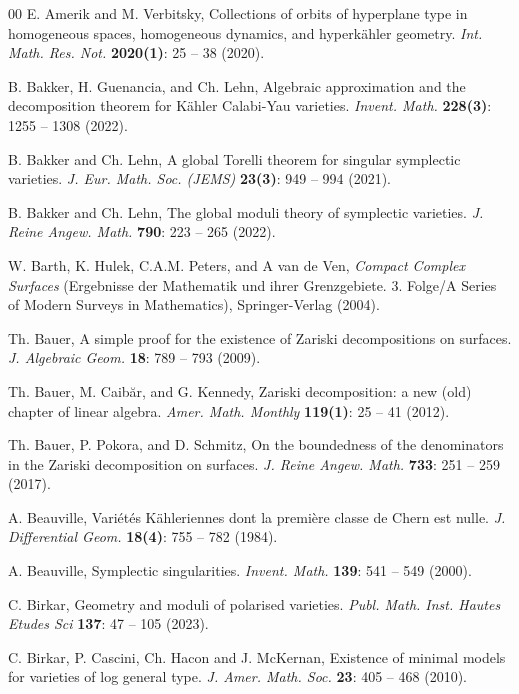 \documentclass[12pt,reqno]{amsart}
\theoremstyle{plain}
\theoremstyle{definition}
\begin{document}
\begin{thebibliography}{00}
E. Amerik and M. Verbitsky, Collections of orbits of hyperplane type in homogeneous spaces, homogeneous dynamics, and hyperk\"ahler geometry. \textit{Int. Math. Res. Not.} \textbf{2020(1)}:  25 -- 38 (2020).


B. Bakker, H. Guenancia, and Ch. Lehn, Algebraic approximation and the decomposition theorem for K\"ahler Calabi-Yau varieties. \textit{Invent. Math.} \textbf{228(3)}: 1255 -- 1308 (2022).


B. Bakker and Ch. Lehn, A global Torelli theorem for singular symplectic varieties. \textit{J. Eur. Math. Soc. (JEMS)} \textbf{23(3)}: 949 -- 994 (2021).

B. Bakker and Ch. Lehn, The global moduli theory of symplectic varieties. \textit{J. Reine Angew. Math.} \textbf{790}: 223 -- 265 (2022).

W. Barth, K. Hulek, C.A.M. Peters, and A van de Ven, \textit{Compact Complex Surfaces} (Ergebnisse der Mathematik und ihrer Grenzgebiete. 3. Folge/A Series of Modern Surveys in Mathematics), Springer-Verlag (2004).

 Th. Bauer, A simple proof for the existence of Zariski decompositions on surfaces. 
\textit{J. Algebraic Geom.} \textbf{18}: 789 -- 793 (2009).

 Th. Bauer, M. Caib\u ar, and G. Kennedy,  Zariski decomposition: a new (old) chapter of linear algebra. \textit{Amer. Math. Monthly} \textbf{119(1)}:  25 -- 41 (2012).

Th. Bauer, P. Pokora, and D. Schmitz, On the boundedness of the denominators in the Zariski decomposition on surfaces. \textit{J. Reine Angew. Math.} \textbf{733}: 251 -- 259 (2017).

A. Beauville, Vari\'et\'es K\"ahleriennes dont la premi\`ere classe de Chern est nulle.
\textit{J. Differential Geom.} \textbf{18(4)}: 755 -- 782 (1984).

 A. Beauville, Symplectic singularities. \textit{Invent. Math.} \textbf{139}: 541 -- 549 (2000). 

C. Birkar, Geometry and moduli of polarised varieties. \textit{Publ. Math. Inst. Hautes Etudes Sci} \textbf{137}: 47 -- 105 (2023).

C. Birkar, P. Cascini, Ch. Hacon and J. McKernan,
Existence of minimal models for varieties of log general type. \textit{J. Amer. Math. Soc.} \textbf{23}:  405 -- 468 (2010). 


\end{thebibliography}
\end{document}
